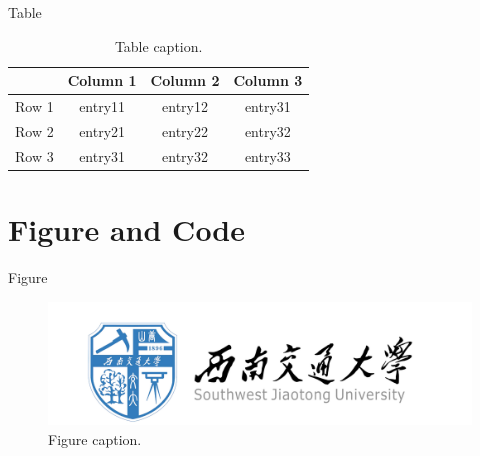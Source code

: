 \documentclass{beamer}
\begin{document}
\begin{frame}{Table}
    \begin{table}
        \centering
        \begin{tabular}{rccc}
             & Column 1 & Column 2 & Column 3 \\\hline
            Row 1 & entry11 & entry12 & entry31 \\
            Row 2 & entry21 & entry22 & entry32 \\
            Row 3 & entry31 & entry32 & entry33 \\
        \end{tabular}
        \caption{Table caption.}
        \label{table demo}
    \end{table}
\end{frame}


\section{Figure and Code}

\begin{frame}{Figure}
\begin{figure}
    \centering
    \includegraphics[scale = 0.15]{src/logo_name_blue.png}
    \caption{Figure caption.}
    \label{fig:fig demo}
\end{figure}
\end{frame}
\end{document}
